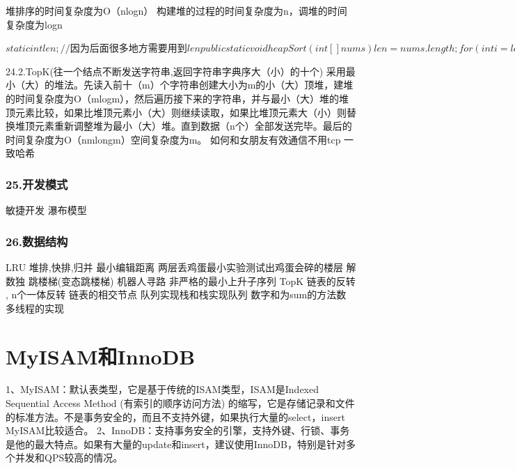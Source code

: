 \documentclass[UTF8]{ctexart}
\begin{document}
堆排序的时间复杂度为O（nlogn） 构建堆的过程的时间复杂度为n，调堆的时间复杂度为logn

$
static int len ;//因为后面很多地方需要用到len
public static void heapSort(int[]nums){
   len =nums.length;
   for(int i =len/2;i>=0;i--){//建立最大堆的过程len=nums.length
       adjustMaxHeap(nums,i);
   }
   for(int i =len-1;i>=0;i--){
       int temp = nums[0];
       nums[0]=nums[i];
       nums[i]=temp;
       len--;
       adjustMaxHeap(nums,0);//传入的时候调整数组的长度在减少，所以len值在改变
   }
}
public static  void  adjustMaxHeap(int[] nums,int i) {
   int leftChild = 2 * i + 1;
   int rightChild = 2 * i + 2;
   int largest = i;
   if (leftChild < len\&\& nums[largest] < nums[leftChild]) {
       largest = leftChild;
   }
   if (rightChild < len \&\& nums[largest] < nums[rightChild]) {
       largest = rightChild;
   }
   if (largest != i) {
       int temp = nums[i];
       nums[i] = nums[largest];
       nums[largest] = temp;
       adjustMaxHeap(nums, largest);
   }
}
$

24.2.TopK(往一个结点不断发送字符串,返回字符串字典序大（小）的十个)
采用最小（大）的堆法。先读入前十（m）个字符串创建大小为m的小（大）顶堆，建堆的时间复杂度为O（mlogm），然后遍历接下来的字符串，并与最小（大）堆的堆顶元素比较，如果比堆顶元素小（大）则继续读取，如果比堆顶元素大（小）则替换堆顶元素重新调整堆为最小（大）堆。直到数据（n个）全部发送完毕。最后的时间复杂度为O（nmlongm）空间复杂度为m。
如何和女朋友有效通信不用tcp
一致哈希
\subsubsection{25.开发模式}
敏捷开发
瀑布模型
\subsubsection{26.数据结构}
LRU
堆排,快排,归并
最小编辑距离
两层丢鸡蛋最小实验测试出鸡蛋会碎的楼层
解数独
跳楼梯(变态跳楼梯)
机器人寻路
非严格的最小上升子序列
TopK
链表的反转 , n个一体反转
链表的相交节点
队列实现栈和栈实现队列
数字和为sum的方法数
多线程的实现
\section{MyISAM和InnoDB}
1、MyISAM：默认表类型，它是基于传统的ISAM类型，ISAM是Indexed Sequential Access Method (有索引的顺序访问方法) 的缩写，它是存储记录和文件的标准方法。不是事务安全的，而且不支持外键，如果执行大量的select，insert MyISAM比较适合。
2、InnoDB：支持事务安全的引擎，支持外键、行锁、事务是他的最大特点。如果有大量的update和insert，建议使用InnoDB，特别是针对多个并发和QPS较高的情况。
\end{document}

